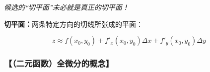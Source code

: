 \begin{center}
	\quad{}
	
	{\it 候选的“切平面”未必就是真正的切平面！}
\end{center}

{\bf 切平面：}两条特定方向的切线所张成的平面：

$$z\approx f(x_0,y_0)+f'_x(x_0,y_0)\Delta x+f'_y(x_0,y_0)\Delta y$$

\subsubsection{【（二元函数）全微分的概念】}

